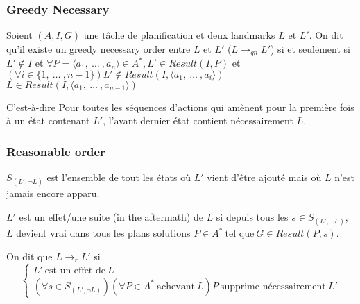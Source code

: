 \begin{frame}
  \frametitle{Greedy Necessary}

  \begin{definition}[$L \rightarrow_{gn} L'$]
     Soient $(A, I, G)$ une tâche de planification et deux landmarks $L$ et $L'$. On dit qu'il existe un greedy necessary order entre $L$ et $L'$ ($L \rightarrow_{gn} L'$) si et seulement si\\
    $L' \notin  I$ et $\forall P = \langle a_1,~\dots~, a_n\rangle \in A^*, L' \in Result(I, P)$ et $(\forall i \in \{1,~\dots~, n-1\}) L' \notin Result(I, \langle a_1,~\dots~,a_i\rangle)$
    $L \in Result(I, \langle a_1,~\dots~, a_{n-1}\rangle)$
  \end{definition}

  \begin{block}{C'est-à-dire}
    Pour toutes les séquences d'actions qui amènent pour la première fois à un état contenant $L'$, l'avant dernier état contient nécessairement $L$.
  \end{block}
\end{frame}

\begin{frame}
  \frametitle{Reasonable order}

  \begin{definition}[$S_{(L',\lnot L)}$]
    $S_{(L',\lnot L)}$ est l'ensemble de tout les états où $L'$ vient d'être ajouté mais où $L$ n'est jamais encore apparu.
  \end{definition}

  \begin{definition}[Aftermath]
    $L'$ est un effet/une suite (in the aftermath) de $L$ si depuis tous les $s \in S_{(L', \lnot L)}$, $L$ devient vrai dans tous les plans solutions $P \in A^*~\text{tel que}~G\in Result(P, s)$.
  \end{definition}

  \begin{definition}[$L \rightarrow_r L'$]
    On dit que  $L \rightarrow_r L'$ si
    \begin{equation*}
      \begin{cases}
        L'~\text{est un effet de}~L\\
        (\forall s \in S_{(L', \lnot L)})(\forall P \in A^*~\text{achevant}~L) P~\text{supprime nécessairement}~L'
      \end{cases}
    \end{equation*}
  \end{definition}
\end{frame}

